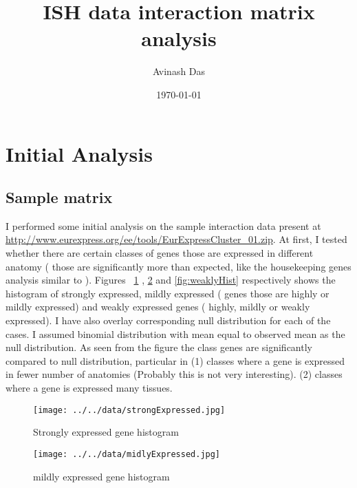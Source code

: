 \documentclass{article}
\title{
ISH data interaction matrix analysis
}
\author{Avinash Das}
\date{\today}
\begin{document}
\pagestyle{fancy}

\maketitle

\section{Initial Analysis}
\subsection{Sample matrix}
I performed some initial analysis on the sample interaction data present at \url{http://www.eurexpress.org/ee/tools/EurExpressCluster_01.zip}.
At first, I tested whether there are certain classes of genes those are expressed in different anatomy ( those are significantly more than expected, like the housekeeping genes analysis similar to \cite{eisenberg2003human}). Figures ~\ref{fig:strongHist} , \ref{fig:mildlyHist} and \ref{fig:weaklyHist} respectively shows the histogram of strongly expressed, mildly expressed ( genes those are highly or mildly expressed) and weakly expressed genes ( highly, mildly or weakly expressed).  
I have also overlay corresponding null distribution for each of the cases. I assumed binomial distribution with mean equal to observed mean as the null distribution. 
As seen from the figure the class genes are significantly compared to null distribution, particular in (1) classes where a gene is expressed in fewer number of anatomies (Probably this is not very interesting). (2) classes where a gene is expressed many tissues. 

\begin{figure}
	\begin{center}
		\texttt{[image: ../../data/strongExpressed.jpg]}
	\end{center}
	\caption{Strongly expressed  gene histogram }
	\label{fig:strongHist}
\end{figure}

\begin{figure}	
	\begin{center}
		\texttt{[image: ../../data/midlyExpressed.jpg]}
	\end{center}
	\caption{mildly expressed gene histogram}
	\label{fig:mildlyHist}
\end{figure}
\end{document}
